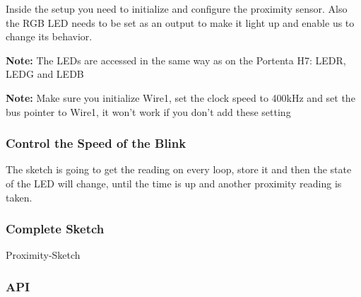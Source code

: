 Inside the setup you need to initialize and configure the proximity sensor. Also the RGB LED needs to be set as an output to make it light up and enable us to change its behavior.

\bigskip

\textbf{Note:} The LEDs are accessed in the same way as on the Portenta H7: LEDR, LEDG and LEDB

\bigskip

\textbf{Note:} Make sure you initialize Wire1, set the clock speed to 400kHz and set the bus pointer to Wire1, it won't work if you don't add these setting
    
\bigskip

\subsubsection{Control the Speed of the Blink}

The sketch is going to get the reading on every loop, store it and then the state of the LED will change, until the time is up and another proximity reading is taken.

\subsubsection{Complete Sketch}


\begin{code}
    {\scriptsize
        
    }
    \caption{Proximity-Sketch}\label{ProximitySketch}
\end{code}

\subsubsection{API}


